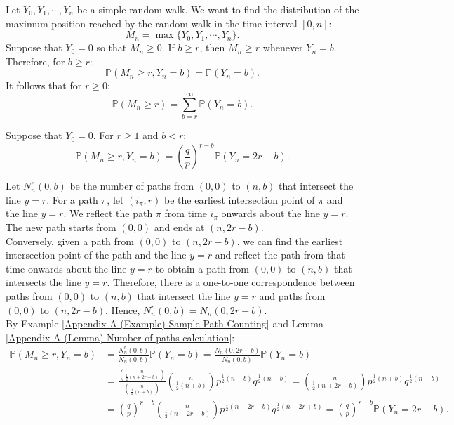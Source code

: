 \documentclass{huhtakm-template-book-v2}
\newcommand{\prob}{\mathbb{P}}
\begin{document}
    \begin{eg}
        Let $Y_{0},Y_{1},\cdots,Y_{n}$ be a simple random walk. We want to find the distribution of the maximum position reached by the random walk in the time interval $[0,n]$:
        \begin{equation*}
            M_{n} = \max\{Y_{0},Y_{1},\cdots,Y_{n}\}.
        \end{equation*}
        Suppose that $Y_{0} = 0$ so that $M_{n} \geq 0$. If $b \geq r$, then $M_{n} \geq r$ whenever $Y_{n} = b$. Therefore, for $b \geq r$:
        \begin{equation*}
            \prob(M_{n} \geq r,Y_{n} = b) = \prob(Y_{n} = b).
        \end{equation*}
        It follows that for $r \geq 0$:
        \begin{equation*}
            \prob(M_{n} \geq r) = \sum_{b = r}^{\infty}\prob(Y_{n} = b).
        \end{equation*}
    \end{eg}
    \begin{thm}
        Suppose that $Y_{0} = 0$. For $r \geq 1$ and $b < r$:
        \begin{equation*}
            \prob(M_{n} \geq r,Y_{n} = b) = \left(\frac{q}{p}\right)^{r-b}\prob(Y_{n} = 2r-b).
        \end{equation*}
    \end{thm}
    \begin{proofing}
        Let $N_{n}^{r}(0,b)$ be the number of paths from $(0,0)$ to $(n,b)$ that intersect the line $y = r$. 
        For a path $\pi$, let $(i_{\pi},r)$ be the earliest intersection point of $\pi$ and the line $y = r$. We reflect the path $\pi$ from time $i_{\pi}$ onwards about the line $y = r$. The new path starts from $(0,0)$ and ends at $(n,2r-b)$.\\
        Conversely, given a path from $(0,0)$ to $(n,2r-b)$, we can find the earliest intersection point of the path and the line $y = r$ and reflect the path from that time onwards about the line $y = r$ to obtain a path from $(0,0)$ to $(n,b)$ that intersects the line $y = r$. 
        Therefore, there is a one-to-one correspondence between paths from $(0,0)$ to $(n,b)$ that intersect the line $y = r$ and paths from $(0,0)$ to $(n,2r-b)$. Hence, $N_{n}^{r}(0,b) = N_{n}(0,2r-b)$.\\
        By Example \ref{Appendix A (Example) Sample Path Counting} and Lemma \ref{Appendix A (Lemma) Number of paths calculation}:
        \begin{align*}
            \prob(M_{n} \geq r,Y_{n} = b) &= \frac{N_{n}^{r}(0,b)}{N_{n}(0,b)}\prob(Y_{n} = b) = \frac{N_{n}(0,2r-b)}{N_{n}(0,b)}\prob(Y_{n} = b)\\
            &= \frac{\binom{n}{\frac{1}{2}(n+2r-b)}}{\binom{n}{\frac{1}{2}(n+b)}}\binom{n}{\frac{1}{2}(n+b)}p^{\frac{1}{2}(n+b)}q^{\frac{1}{2}(n-b)} = \binom{n}{\frac{1}{2}(n+2r-b)}p^{\frac{1}{2}(n+b)}q^{\frac{1}{2}(n-b)}\\
            &= \left(\frac{q}{p}\right)^{r-b}\binom{n}{\frac{1}{2}(n+2r-b)}p^{\frac{1}{2}(n+2r-b)}q^{\frac{1}{2}(n-2r+b)} = \left(\frac{q}{p}\right)^{r-b}\prob(Y_{n} = 2r-b).
        \end{align*}
    \end{proofing}
\end{document}
